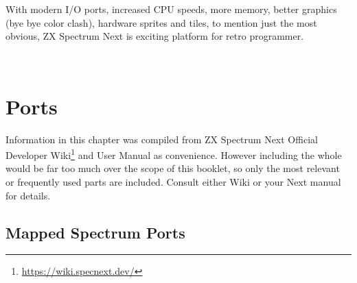 \documentclass[12pt,twoside,openright,a4paper]{book}
\begin{document}
\environbodyname\BITTABLEBODY
{}

With modern I/O ports, increased CPU speeds, more memory, better graphics (bye bye color clash), hardware sprites and tiles, to mention just the most obvious, ZX Spectrum Next is exciting platform for retro programmer.

~ %

\minitoc

\pagebreak
\section{Ports}

Information in this chapter was compiled from ZX Spectrum Next Official Developer Wiki\footnote{\url{https://wiki.specnext.dev/}} and User Manual as convenience. However including the whole would be far too much over the scope of this booklet, so only the most relevant or frequently used parts are included. Consult either Wiki or your Next manual for details.

\subsection{Mapped Spectrum Ports}
\end{document}
